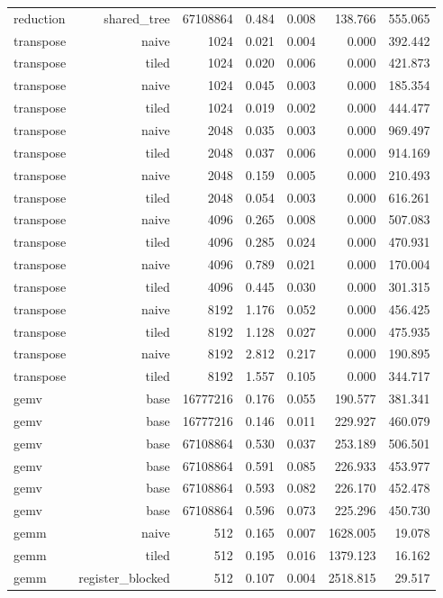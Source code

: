 \begin{longtable}{lrrrrrr}
reduction & shared\_tree & 67108864 & 0.484 & 0.008 & 138.766 & 555.065 \\
transpose & naive & 1024 & 0.021 & 0.004 & 0.000 & 392.442 \\
transpose & tiled & 1024 & 0.020 & 0.006 & 0.000 & 421.873 \\
transpose & naive & 1024 & 0.045 & 0.003 & 0.000 & 185.354 \\
transpose & tiled & 1024 & 0.019 & 0.002 & 0.000 & 444.477 \\
transpose & naive & 2048 & 0.035 & 0.003 & 0.000 & 969.497 \\
transpose & tiled & 2048 & 0.037 & 0.006 & 0.000 & 914.169 \\
transpose & naive & 2048 & 0.159 & 0.005 & 0.000 & 210.493 \\
transpose & tiled & 2048 & 0.054 & 0.003 & 0.000 & 616.261 \\
transpose & naive & 4096 & 0.265 & 0.008 & 0.000 & 507.083 \\
transpose & tiled & 4096 & 0.285 & 0.024 & 0.000 & 470.931 \\
transpose & naive & 4096 & 0.789 & 0.021 & 0.000 & 170.004 \\
transpose & tiled & 4096 & 0.445 & 0.030 & 0.000 & 301.315 \\
transpose & naive & 8192 & 1.176 & 0.052 & 0.000 & 456.425 \\
transpose & tiled & 8192 & 1.128 & 0.027 & 0.000 & 475.935 \\
transpose & naive & 8192 & 2.812 & 0.217 & 0.000 & 190.895 \\
transpose & tiled & 8192 & 1.557 & 0.105 & 0.000 & 344.717 \\
gemv & base & 16777216 & 0.176 & 0.055 & 190.577 & 381.341 \\
gemv & base & 16777216 & 0.146 & 0.011 & 229.927 & 460.079 \\
gemv & base & 67108864 & 0.530 & 0.037 & 253.189 & 506.501 \\
gemv & base & 67108864 & 0.591 & 0.085 & 226.933 & 453.977 \\
gemv & base & 67108864 & 0.593 & 0.082 & 226.170 & 452.478 \\
gemv & base & 67108864 & 0.596 & 0.073 & 225.296 & 450.730 \\
gemm & naive & 512 & 0.165 & 0.007 & 1628.005 & 19.078 \\
gemm & tiled & 512 & 0.195 & 0.016 & 1379.123 & 16.162 \\
gemm & register\_blocked & 512 & 0.107 & 0.004 & 2518.815 & 29.517 \\

\end{longtable}
